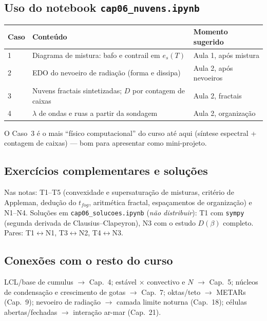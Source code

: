 \subsection*{Uso do notebook \texttt{cap06\_nuvens.ipynb}}

\begin{center}
\begin{tabular}{lll}
\hline
Caso & Conteúdo & Momento sugerido \\
\hline
1 & Diagrama de mistura: bafo e contrail em $e_s(T)$ & Aula 1, após mistura \\
2 & EDO do nevoeiro de radiação (forma e dissipa) & Aula 2, após nevoeiros \\
3 & Nuvens fractais sintetizadas; $D$ por contagem de caixas & Aula 2, fractais \\
4 & $\lambda$ de ondas e ruas a partir da sondagem & Aula 2, organização \\
\hline
\end{tabular}
\end{center}

O Caso~3 é o mais ``físico computacional'' do curso até aqui (síntese
espectral + contagem de caixas) — bom para apresentar como mini-projeto.

\subsection*{Exercícios complementares e soluções}

Nas notas: T1--T5 (convexidade e supersaturação de misturas, critério de
Appleman, dedução do $t_{fog}$, aritmética fractal, espaçamentos de
organização) e N1--N4. Soluções em \texttt{cap06\_solucoes.ipynb}
(\emph{não distribuir}): T1 com \texttt{sympy} (segunda derivada de
Clausius--Clapeyron), N3 com o estudo $D(\beta)$ completo. Pares:
T1$\leftrightarrow$N1, T3$\leftrightarrow$N2, T4$\leftrightarrow$N3.

\subsection*{Conexões com o resto do curso}

LCL/base de cumulus $\to$ Cap.~4; estável × convectivo e $N$ $\to$ Cap.~5;
núcleos de condensação e crescimento de gotas $\to$ Cap.~7; oktas/teto
$\to$ METARs (Cap.~9); nevoeiro de radiação $\to$ camada limite noturna
(Cap.~18); células abertas/fechadas $\to$ interação ar-mar (Cap.~21).
